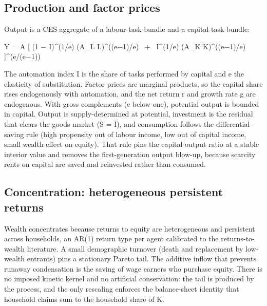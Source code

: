 \documentclass[12pt]{article}
\begin{document}
\hypertarget{production-and-factor-prices}{%
\subsection{Production and factor
prices}\label{production-and-factor-prices}}

Output is a CES aggregate of a labour-task bundle and a capital-task
bundle:

Y = A \textperiodcentered{} {[} (1 $-$ I)\^{}(1/e) \textperiodcentered{} (A\_L L)\^{}((e$-$1)/e) ~+~ I\^{}(1/e) \textperiodcentered{}
(A\_K K)\^{}((e$-$1)/e) {]}\^{}(e/(e$-$1))

The automation index I is the share of tasks performed by capital and e
the elasticity of substitution. Factor prices are marginal products, so
the capital share rises endogenously with automation, and the net return
r and growth rate g are endogenous. With gross complements (e below
one), potential output is bounded in capital. Output is
supply-determined at potential, investment is the residual that clears
the goods market (S = I), and consumption follows the
differential-saving rule (high propensity out of labour income, low out
of capital income, small wealth effect on equity). That rule pins the
capital-output ratio at a stable interior value and removes the
first-generation output blow-up, because scarcity rents on capital are
saved and reinvested rather than consumed.

\hypertarget{concentration-heterogeneous-persistent-returns}{%
\subsection{Concentration: heterogeneous persistent
returns}\label{concentration-heterogeneous-persistent-returns}}

Wealth concentrates because returns to equity are heterogeneous and
persistent across households, an AR(1) return type per agent calibrated
to the returns-to-wealth literature. A small demographic turnover (death
and replacement by low-wealth entrants) pins a stationary Pareto tail.
The additive inflow that prevents runaway condensation is the saving of
wage earners who purchase equity. There is no imposed kinetic kernel and
no artificial conservation: the tail is produced by the process, and the
only rescaling enforces the balance-sheet identity that household claims
sum to the household share of K.
\end{document}
